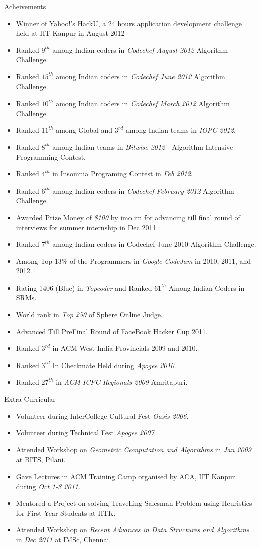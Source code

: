 \documentclass[11pt,oneside]{article}
\newenvironment{ressection}[1]{
	\vspace{4pt}
	{\fontfamily{phv}\selectfont\Large#1}
	\begin{itemize}
	\vspace{3pt}
}{
	\end{itemize}
}
\newcommand{\resitem}[1]{
	\vspace{-4pt}
	\item \begin{flushleft} #1 \end{flushleft}
}
\begin{document}
\begin{ressection}{Acheivements}

\resitem{Winner of Yahoo!'s HackU, a 24 hours application development challenge held at IIT Kanpur in August 2012}
\resitem{Ranked \textit{$9^{th}$} among Indian coders in \textit{Codechef August 2012} Algorithm Challenge.}
\resitem{Ranked \textit{$15^{th}$} among Indian coders in \textit{Codechef June 2012} Algorithm Challenge.}
\resitem{Ranked \textit{$10^{th}$} among Indian coders in \textit{Codechef March 2012} Algorithm Challenge.}
\resitem{Ranked \textit{$11^{th}$} among Global and $3^{rd}$ among Indian teams in \textit{IOPC 2012}. }
\resitem{Ranked \textit{$8^{th}$} among Indian teams in \textit{Bitwise 2012} - Algorithm Intensive Programming Contest.}
\resitem{Ranked \textit{$4^{th}$} in Insomnia Programing Contest in \textit{Feb 2012}. }
\resitem{Ranked \textit{$6^{th}$} among Indian coders in \textit{Codechef February 2012} Algorithm Challenge.}
\resitem{Awarded Prize Money of \textit{\$100} by imo.im for advancing till final round of interviews for summer internship in Dec 2011.}
\resitem{Ranked \textit{$7^{th}$} among Indian coders in Codechef June 2010 Algorithm Challenge.}
\resitem{Among Top 13\% of the Programmers in \textit{Google CodeJam} in 2010, 2011, and 2012.}
\resitem{Rating 1406 (Blue) in \textit{Topcoder} and Ranked \textit{$61^{th}$} Among Indian Coders in SRMs.}
\resitem{World rank in \textit{Top 250} of Sphere Online Judge.}
\resitem{Advanced Till PreFinal Round of FaceBook Hacker Cup 2011.}
\resitem{Ranked \textit{$3^{rd}$} in ACM West India Provincials 2009 and 2010.}
\resitem{Ranked \textit{$3^{rd}$} In Checkmate Held during \textit{Apogee 2010}. }
\resitem{Ranked \textit{$27^{th}$} in \textit{ACM ICPC Regionals 2009} Amritapuri.}

\end{ressection}

\begin{ressection}{Extra Curricular}
 \resitem{Volunteer during InterCollege Cultural Fest \textit{Oasis 2006}.}
 \resitem{Volunteer during Technical Fest \textit{Apogee 2007}.}
 \resitem{Attended Workshop on \textit{Geometric Computation and Algorithms} in \textit{Jan 2009} at BITS, Pilani.}
 \resitem{Gave Lectures in ACM Training Camp organised by ACA, IIT Kanpur during \textit{Oct 1-8 2011}.}
 \resitem{Mentored a Project on solving Travelling Salesman Problem using Heuristics for First Year Students at IITK.}
 \resitem{Attended Workshop on \textit{Recent Advances in Data Structures and Algorithms} in \textit{Dec 2011} at IMSc, Chennai.}
\end{ressection}
\end{document}
